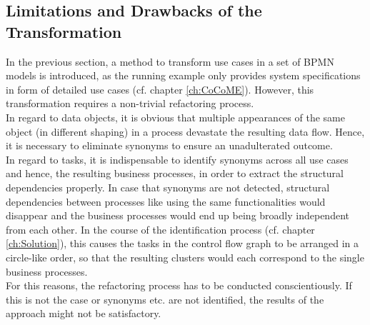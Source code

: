 \subsection{Limitations and Drawbacks of the Transformation}
In the previous section, a method to transform use cases in a set of BPMN models is introduced, as the running example only provides system specifications in form of detailed use cases (cf. chapter \ref{ch:CoCoME}). However, this transformation requires a non-trivial refactoring process. \\
In regard to data objects, it is obvious that multiple appearances of the same object (in different shaping) in a process devastate the resulting data flow. Hence, it is necessary to eliminate synonyms to ensure an unadulterated outcome.\\
In regard to tasks, it is indispensable to identify synonyms across all use cases and hence, the resulting business processes, in order to extract the structural dependencies properly. In case that synonyms are not detected, structural dependencies between processes like using the same functionalities would disappear and the business processes would end up being broadly independent from each other. In the course of the identification process (cf. chapter \ref{ch:Solution}), this causes the tasks in the control flow graph to be arranged in a circle-like order, so that the resulting clusters would each correspond to the single business processes. \\
For this reasons, the refactoring process has to be conducted 
conscientiously. If this is not the case or synonyms etc. are not identified, the results of the approach might not be satisfactory.






